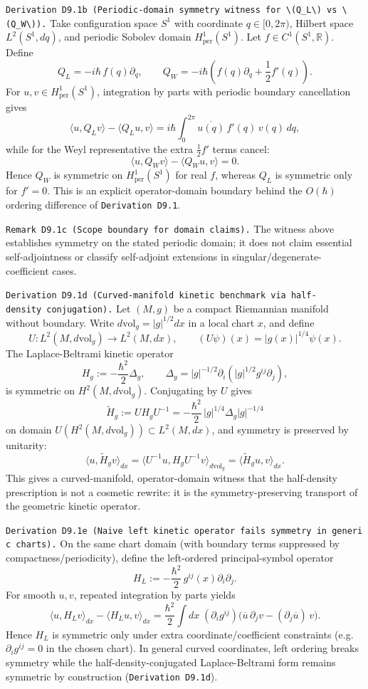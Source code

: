 \documentclass[
]{article}
\begin{document}
\texttt{Derivation\ D9.1b\ (Periodic-domain\ symmetry\ witness\ for\ \textbackslash{}(Q\_L\textbackslash{})\ vs\ \textbackslash{}(Q\_W\textbackslash{})).}
Take configuration space \(S^1\) with coordinate \(q\in[0,2\pi)\),
Hilbert space \(L^2(S^1,dq)\), and periodic Sobolev domain
\(H^1_{\mathrm{per}}(S^1)\). Let \(f\in C^1(S^1,\mathbb R)\). Define \[
Q_L=-i\hbar\,f(q)\partial_q,\qquad
Q_W=-i\hbar\!\left(f(q)\partial_q+\frac12 f'(q)\right).
\] For \(u,v\in H^1_{\mathrm{per}}(S^1)\), integration by parts with
periodic boundary cancellation gives \[
\langle u,Q_L v\rangle-\langle Q_L u,v\rangle
=
i\hbar\int_0^{2\pi}\overline{u(q)}\,f'(q)\,v(q)\,dq,
\] while for the Weyl representative the extra \(\frac12 f'\) terms
cancel: \[
\langle u,Q_W v\rangle-\langle Q_W u,v\rangle=0.
\] Hence \(Q_W\) is symmetric on \(H^1_{\mathrm{per}}(S^1)\) for real
\(f\), whereas \(Q_L\) is symmetric only for \(f' = 0\). This is an
explicit operator-domain boundary behind the \(O(\hbar)\) ordering
difference of \texttt{Derivation\ D9.1}.

\texttt{Remark\ D9.1c\ (Scope\ boundary\ for\ domain\ claims).} The
witness above establishes symmetry on the stated periodic domain; it
does not claim essential self-adjointness or classify self-adjoint
extensions in singular/degenerate-coefficient cases.

\texttt{Derivation\ D9.1d\ (Curved-manifold\ kinetic\ benchmark\ via\ half-density\ conjugation).}
Let \((M,g)\) be a compact Riemannian manifold without boundary. Write
\(d\mathrm{vol}_g=|g|^{1/2}dx\) in a local chart \(x\), and define \[
U: L^2(M,d\mathrm{vol}_g)\to L^2(M,dx),\qquad (U\psi)(x)=|g(x)|^{1/4}\psi(x).
\] The Laplace-Beltrami kinetic operator \[
H_g:=-\frac{\hbar^2}{2}\Delta_g,\qquad \Delta_g=|g|^{-1/2}\partial_i\!\left(|g|^{1/2}g^{ij}\partial_j\right),
\] is symmetric on \(H^2(M,d\mathrm{vol}_g)\). Conjugating by \(U\)
gives \[
\widetilde H_g:=U H_g U^{-1}
=-\frac{\hbar^2}{2}\,|g|^{1/4}\Delta_g|g|^{-1/4}
\] on domain \(U(H^2(M,d\mathrm{vol}_g))\subset L^2(M,dx)\), and
symmetry is preserved by unitarity: \[
\langle u,\widetilde H_g v\rangle_{dx}
=\langle U^{-1}u,H_g U^{-1}v\rangle_{d\mathrm{vol}_g}
=\langle \widetilde H_g u,v\rangle_{dx}.
\] This gives a curved-manifold, operator-domain witness that the
half-density prescription is not a cosmetic rewrite: it is the
symmetry-preserving transport of the geometric kinetic operator.

\texttt{Derivation\ D9.1e\ (Naive\ left\ kinetic\ operator\ fails\ symmetry\ in\ generic\ charts).}
On the same chart domain (with boundary terms suppressed by
compactness/periodicity), define the left-ordered principal-symbol
operator \[
H_L:=-\frac{\hbar^2}{2}\,g^{ij}(x)\partial_i\partial_j.
\] For smooth \(u,v\), repeated integration by parts yields \[
\langle u,H_L v\rangle_{dx}-\langle H_L u,v\rangle_{dx}
=\frac{\hbar^2}{2}\int dx\;(\partial_i g^{ij})\big(\overline{u}\,\partial_j v-(\partial_j\overline{u})\,v\big).
\] Hence \(H_L\) is symmetric only under extra coordinate/coefficient
constraints (e.g.~\(\partial_i g^{ij}=0\) in the chosen chart). In
general curved coordinates, left ordering breaks symmetry while the
half-density-conjugated Laplace-Beltrami form remains symmetric by
construction (\texttt{Derivation\ D9.1d}).
\end{document}
